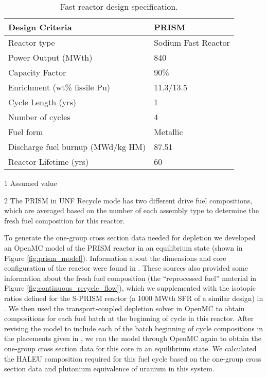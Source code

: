 \begin{table}[h!]
    \centering
    \begin{threeparttable}

    \caption{Fast reactor design specification.}
    \label{tab:fast_rx}
    \begin{tabular}{l l}
        \hline
        Design Criteria & PRISM \cite{triplett_prism:_2012,fichtlscherer_assessing_2019}\\
        \hline
        Reactor type & Sodium Fast Reactor\\
        Power Output (MWth) & 840 \\
        Capacity Factor & 90\%\tnote{1} \\
        Enrichment (wt\% fissile Pu) &  11.3/13.5\tnote{2}\\
        Cycle Length (yrs) & 1 \\
        Number of cycles &  4\\
        Fuel form &  Metallic \\
        Discharge fuel burnup (MWd/kg HM) & 87.51 \\
        Reactor Lifetime (yrs)&  60\\
        \hline
    \end{tabular}
    \begin{tablenotes}
        \item [1] Assumed value
        \item [2] The PRISM in UNF Recycle mode has two different drive fuel compositions,
                  which are averaged based on the number of each assembly type to determine 
                  the fresh fuel composition for this reactor.
    \end{tablenotes}
\end{threeparttable}
\end{table}

To generate the one-group cross section data needed for 
depletion we developed an OpenMC model of the PRISM reactor in 
an equilibrium state (shown in 
Figure \ref{fig:prism_model}). Information about the 
dimensions and core configuration of the reactor were found in 
\cite{triplett_prism:_2012,fichtlscherer_assessing_2019}. 
These sources also provided some 
information about the fresh fuel composition (the ``reprocessed 
fuel'' material in Figure \ref{fig:continuous_recycle_flow}), which 
we supplemented 
with the isotopic ratios defined for the S-PRISM reactor (a 1000 MWth
\gls{SFR} of a similar design) in \cite{sumner_effects_2011}.
We then used the transport-coupled depletion solver in OpenMC to 
obtain compositions for each fuel batch at the beginning of cycle 
in this reactor. After revising the model to include each of the 
batch beginning of cycle compositions in the placements given 
in \cite{fichtlscherer_assessing_2019}, we ran the model 
through OpenMC again to obtain the one-group cross section data 
for this core in an equilibrium state. We calculated
the \gls{HALEU} composition required for this fuel cycle based on the
one-group cross section data and plutonium equivalence of 
uranium in this system.

